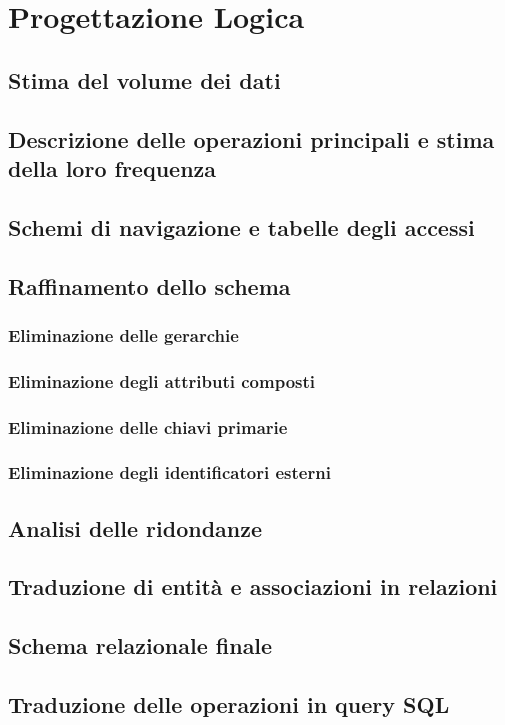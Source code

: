 \chapter{Progettazione Logica}
\section{Stima del volume dei dati}
\section{Descrizione delle operazioni principali e stima della loro frequenza}
\section{Schemi di navigazione e tabelle degli accessi}
\section{Raffinamento dello schema}
\subsection{Eliminazione delle gerarchie}
\subsection{Eliminazione degli attributi composti}
\subsection{Eliminazione delle chiavi primarie}
\subsection{Eliminazione degli identificatori esterni}
\section{Analisi delle ridondanze}
\section{Traduzione di entità e associazioni in relazioni}
\section{Schema relazionale finale}
\section{Traduzione delle operazioni in query SQL}